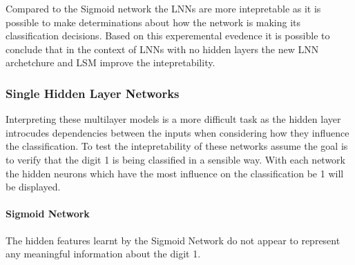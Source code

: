 Compared to the Sigmoid network the LNNs are more intepretable as it is possible to make determinations about how the network is making its classification decisions. Based on this experemental evedence it is possible to conclude that in the context of LNNs with no hidden layers the new LNN archetchure and LSM improve the intepretability.

\subsubsection{Single Hidden Layer Networks}

Interpreting these multilayer models is a more difficult task as the hidden layer introcudes dependencies between the inputs when considering how they influence the classification. To test the intepretability of these networks assume the goal is to verify that the digit 1 is being classified in a sensible way. With each network the hidden neurons which have the most influence on the classification be 1 will be displayed.

\paragraph{Sigmoid Network}
The hidden features learnt by the Sigmoid Network do not appear to represent any meaningful information about the digit 1.

